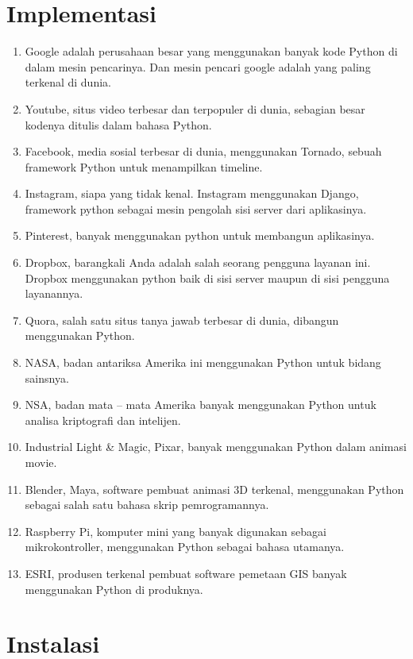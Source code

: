 \documentclass[lipt]{Article}
\begin{document}
\section{Implementasi}
\begin{enumerate}
\item
Google adalah perusahaan besar yang menggunakan banyak kode Python di dalam mesin pencarinya. Dan mesin pencari google adalah yang paling terkenal di dunia.
\item
Youtube, situs video terbesar dan terpopuler di dunia, sebagian besar kodenya ditulis dalam bahasa Python.
\item
Facebook, media sosial terbesar di dunia, menggunakan Tornado, sebuah framework Python untuk menampilkan timeline.
\item
Instagram, siapa yang tidak kenal. Instagram menggunakan Django, framework python sebagai mesin pengolah sisi server dari aplikasinya.
\item
Pinterest, banyak menggunakan python untuk membangun aplikasinya.
\item
Dropbox, barangkali Anda adalah salah seorang pengguna layanan ini. Dropbox menggunakan python baik di sisi server maupun di sisi pengguna layanannya.
\item
Quora, salah satu situs tanya jawab terbesar di dunia, dibangun menggunakan Python.
\item
NASA, badan antariksa Amerika ini menggunakan Python untuk bidang sainsnya.
\item
NSA, badan mata – mata Amerika banyak menggunakan Python untuk analisa kriptografi dan intelijen.
\item
Industrial Light & Magic, Pixar, banyak menggunakan Python dalam animasi movie.
\item
Blender, Maya, software pembuat animasi 3D terkenal, menggunakan Python sebagai salah satu bahasa skrip pemrogramannya.
\item
Raspberry Pi, komputer mini yang banyak digunakan sebagai mikrokontroller, menggunakan Python sebagai bahasa utamanya.
\item
ESRI, produsen terkenal pembuat software pemetaan GIS banyak menggunakan Python di produknya.
\end{enumerate}

\section{Instalasi}
\end{document}
